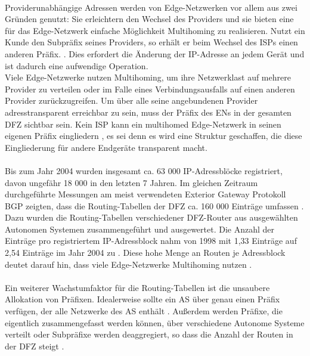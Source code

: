 \paragraph{}
Providerunabhängige Adressen werden von Edge-Netzwerken vor allem aus zwei Gründen genutzt: Sie erleichtern den Wechsel des Providers und sie bieten eine für das Edge-Netzwerk einfache Möglichkeit Multihoming zu realisieren. Nutzt ein Kunde den Subpräfix seines Providers, so erhält er beim Wechsel des ISPs einen anderen Präfix. \cite{jen:2008:start}. Dies erfordert die Änderung der IP-Adresse an jedem Gerät und ist dadurch eine aufwendige Operation. \\
Viele Edge-Netzwerke nutzen Multihoming, um ihre Netzwerklast auf mehrere Provider zu verteilen oder im Falle eines Verbindungsausfalls auf einen anderen Provider zurückzugreifen. Um über alle seine angebundenen Provider adresstransparent erreichbar zu sein, muss der Präfix des ENs in der gesamten DFZ sichtbar sein. Kein ISP kann ein multihomed Edge-Netzwerk in seinen eigenen Präfix eingliedern \cite{jen:2008:start}, es sei denn es wird eine Struktur geschaffen, die diese Eingliederung für andere Endgeräte transparent macht.

\paragraph{}
Bis zum Jahr 2004 wurden insgesamt ca. 63 000 IP-Adressblöcke registriert, davon ungefähr 18 000 in den letzten 7 Jahren. Im gleichen Zeitraum durchgeführte Messungen am meist verwendeten Exterior Gateway Protokoll BGP zeigten, dass die Routing-Tabellen der DFZ ca. 160 000 Einträge umfassen \cite{journals/ccr/MengXZHLZ04}. Dazu wurden die Routing-Tabellen verschiedener DFZ-Router aus ausgewählten Autonomen Systemen zusammengeführt und ausgewertet. Die Anzahl der Einträge pro registriertem IP-Adressblock nahm von 1998 mit 1,33 Einträge auf 2,54 Einträge im Jahr 2004 zu \cite{journals/ccr/MengXZHLZ04}. Diese hohe Menge an Routen je Adressblock deutet darauf hin, dass viele Edge-Netzwerke Multihoming nutzen \cite{huston:2001:analyzing}.

\paragraph{}
Ein weiterer Wachstumfaktor für die Routing-Tabellen ist die unsaubere Allokation von Präfixen. Idealerweise sollte ein AS über genau einen Präfix verfügen, der alle Netzwerke des AS enthält \cite{hawkinson:1996:autnomousSystems}. Außerdem werden Präfixe, die eigentlich zusammengefasst werden können, über verschiedene Autonome Systeme verteilt oder Subpräfixe werden deaggregiert, so dass die Anzahl der Routen in der DFZ steigt \cite{journals/ccr/MengXZHLZ04}. \\

